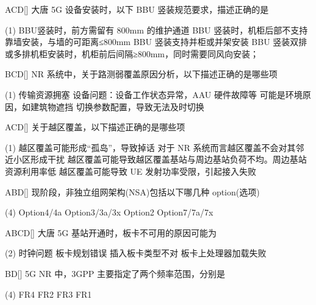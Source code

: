 \begin{choice}{\;ACD\;}[]
    大唐 5G 设备安装时，以下 BBU 竖装规范要求，描述正确的是
    \begin{tasks}(1)
        \task BBU竖装时，前方需留有 800mm 的维护通道
        \task  BBU 竖装时，机柜后部不支持靠墙安装，与墙的可距离≤800mm
        \task BBU 竖装支持并柜或并架安装
        \task BBU 竖装双排或多排机柜安装时，机柜前后间隔≥800mm，同时需要同风向安装；
    \end{tasks}
\end{choice}

\begin{choice}{\;BCD\;}[]
    NR 系统中，关于路测弱覆盖原因分析，以下描述正确的是哪些项
    \begin{tasks}(1)
        \task 传输资源拥塞
        \task 设备问题：设备工作状态异常，AAU 硬件故障等
        \task 可能是环境原因，如建筑物遮挡
        \task 切换参数配置，导致无法及时切换
    \end{tasks}
\end{choice}

\begin{choice}{\;ACD\;}[]
    关于越区覆盖，以下描述正确的是哪些项
    \begin{tasks}(1)
        \task 越区覆盖可能形成“孤岛”，导致掉话
        \task 对于 NR 系统而言越区覆盖不会对其邻近小区形成干扰
        \task 越区覆盖可能导致越区覆盖基站与周边基站负荷不均。周边基站资源利用率低
        \task 越区覆盖可能导致 UE 发射功率受限，引起接入失败
    \end{tasks}
\end{choice}

\begin{choice}{\;ABD\;}[]
    现阶段，非独立组网架构(NSA)包括以下哪几种 option(选项)
    \begin{tasks}(4)
        \task  Option4/4a
        \task Option3/3a/3x 
        \task Option2
        \task Option7/7a/7x
    \end{tasks}
\end{choice}

\begin{choice}{\;ABCD\;}[]
    大唐 5G 基站开通时，板卡不可用的原因可能为
    \begin{tasks}(2)
        \task 时钟问题
        \task 板卡规划错误
        \task  插入板卡类型不对 
        \task 板卡上处理器加载失败
    \end{tasks}
\end{choice}

\begin{choice}{\;BD\;}[]
    5G NR 中，3GPP 主要指定了两个频率范围，分别是
    \begin{tasks}(4)
        \task  FR4 
        \task FR2 
        \task FR3 
        \task  FR1
    \end{tasks}
\end{choice}

